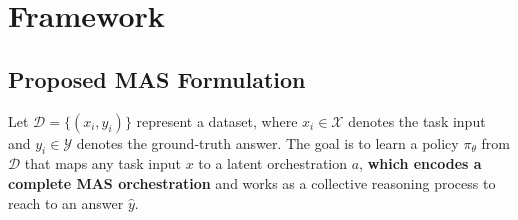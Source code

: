 \section{\ourframework Framework}
\label{sec.framework}

\subsection{Proposed MAS Formulation}



Let $\mathcal{D} = \{(x_i, y_i)\}$ represent a dataset, where $x_i \in \mathcal{X}$ denotes the task input and $y_i \in \mathcal{Y}$ denotes the ground-truth answer. {The goal is to learn a policy $\pi_\theta$ from $\mathcal{D}$ that maps any task input ${x}$ to a latent  orchestration $a$, \textbf{which encodes a complete MAS orchestration} and works as a collective reasoning process to reach to an answer $\hat{y}$.} 

